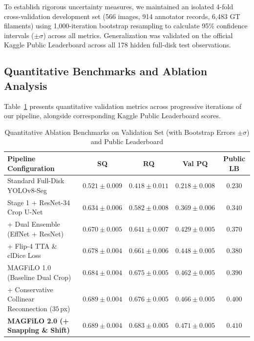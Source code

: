 \documentclass[sigconf]{acmart}
\begin{document}
To establish rigorous uncertainty measures, we maintained an isolated 4-fold cross-validation development set (566 images, 914 annotator records, 6,483 GT filaments) using 1,000-iteration bootstrap resampling to calculate 95\% confidence intervals ($\pm \sigma$) across all metrics. Generalization was validated on the official Kaggle Public Leaderboard across all 178 hidden full-disk test observations.

\subsection{Quantitative Benchmarks and Ablation Analysis}
Table~\ref{tab:ablation} presents quantitative validation metrics across progressive iterations of our pipeline, alongside corresponding Kaggle Public Leaderboard scores.

\begin{table}[htbp]
\caption{Quantitative Ablation Benchmarks on Validation Set (with Bootstrap Errors $\pm\sigma$) and Public Leaderboard}
\label{tab:ablation}
\centering
\footnotesize
\setlength{\tabcolsep}{3pt}
\begin{tabular}{lcccc}
\toprule
\textbf{Pipeline Configuration} & \textbf{SQ} & \textbf{RQ} & \textbf{Val PQ} & \textbf{Public LB} \\
\midrule
Standard Full-Disk YOLOv8-Seg & $0.521 \pm 0.009$ & $0.418 \pm 0.011$ & $0.218 \pm 0.008$ & $0.230$ \\
Stage 1 + ResNet-34 Crop U-Net & $0.634 \pm 0.006$ & $0.582 \pm 0.008$ & $0.369 \pm 0.006$ & $0.340$ \\
+ Dual Ensemble (EffNet + ResNet) & $0.670 \pm 0.005$ & $0.641 \pm 0.007$ & $0.429 \pm 0.005$ & $0.370$ \\
+ Flip-4 TTA \& clDice Loss & $0.678 \pm 0.004$ & $0.661 \pm 0.006$ & $0.448 \pm 0.005$ & $0.380$ \\
MAGFiLO 1.0 (Baseline Dual Crop) & $0.684 \pm 0.004$ & $0.675 \pm 0.005$ & $0.462 \pm 0.005$ & $0.390$ \\
+ Conservative Collinear Reconnection ($35$\,px) & $0.689 \pm 0.004$ & $0.676 \pm 0.005$ & $0.466 \pm 0.005$ & $0.400$ \\
\textbf{MAGFiLO 2.0 (+ Snapping \& Shift)} & $\mathbf{0.689 \pm 0.004}$ & $\mathbf{0.683 \pm 0.005}$ & $\mathbf{0.471 \pm 0.005}$ & $\mathbf{0.410}$ \\
\bottomrule
\end{tabular}
\end{table}
\end{document}
